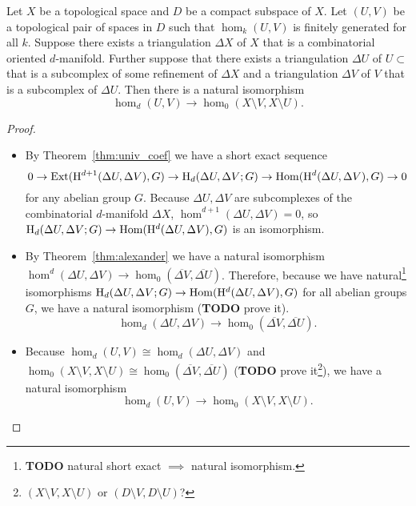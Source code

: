 \begin{theorem}
  Let $X$ be a topological space and $D$ be a compact subspace of $X$.
  Let $(U, V)$ be a topological pair of spaces in $D$ such that $\hom_k(U,V)$ is finitely generated for all $k$.
  Suppose there exists a triangulation $\Delta X$ of $X$ that is a combinatorial oriented $d$-manifold.
  Further suppose that there exists a triangulation $\Delta U$ of $U\subset$ that is a subcomplex of some refinement of $\Delta X$ and a triangulation $\Delta V$ of $V$ that is a subcomplex of $\Delta U$.
  Then there is a natural isomorphism
  \[ \hom_d(U, V)\to \hom_0(X\setminus V, X\setminus U).\]
\end{theorem}
\begin{proof}
  \begin{itemize}
    \item By Theorem~\ref{thm:univ_coef} we have a short exact sequence
      \[ 0\to\mathrm{Ext}(\mathrm{H}^{d+1}(\Delta U, \Delta V), G)\to \mathrm{H}_d(\Delta U, \Delta V; G)\to \mathrm{Hom}(\mathrm{H}^d(\Delta U, \Delta V), G)\to 0\]
      for any abelian group $G$.
      Because $\Delta U,\Delta V$ are subcomplexes of the combinatorial $d$-manifold $\Delta X$, $\hom^{d+1}(\Delta U, \Delta V) = 0$, so $\mathrm{H}_d(\Delta U, \Delta V; G)\to \mathrm{Hom}(\mathrm{H}^d(\Delta U, \Delta V), G)$ is an isomorphism.
    \item By Theorem~\ref{thm:alexander} we have a natural isomorphism $\hom^d(\Delta U, \Delta V)\to \hom_0(\overline{\Delta V},\overline{\Delta U})$.
      Therefore, because we have natural\footnote{\textbf{TODO} natural short exact $\implies$ natural isomorphism.} isomorphisms $\mathrm{H}_d(\Delta U, \Delta V; G)\to \mathrm{Hom}(\mathrm{H}^d(\Delta U, \Delta V), G)$ for all abelian groups $G$, we have a natural isomorphism (\textbf{TODO} prove it).
      \[\hom_d(\Delta U, \Delta V)\to \hom_0(\overline{\Delta V},\overline{\Delta U}).\]
    \item Because $\hom_d(U, V)\cong \hom_d(\Delta U, \Delta V)$ and $\hom_0(X\setminus V, X\setminus U)\cong \hom_0(\overline{\Delta V},\overline{\Delta U})$ (\textbf{TODO} prove it\footnote{$(X\setminus V, X\setminus U)$ or $(D\setminus V, D\setminus U)$?}), we have a natural isomorphism
    \[ \hom_d(U, V)\to \hom_0(X\setminus V, X\setminus U). \]
  \end{itemize}
\end{proof}


